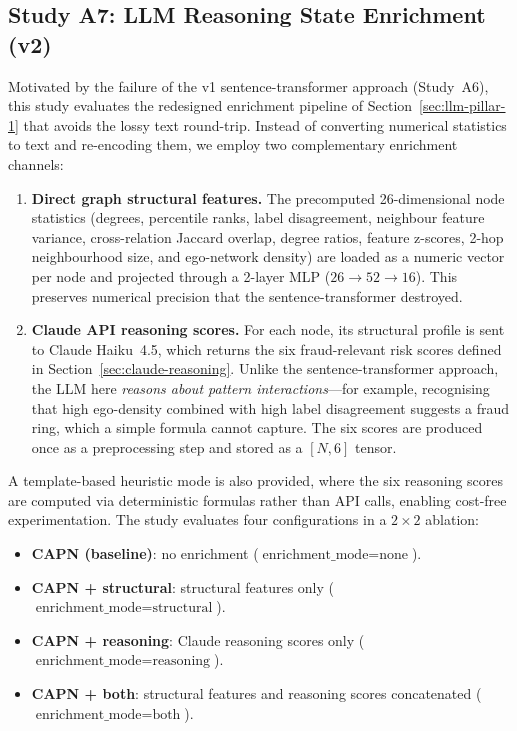 \subsection{Study A7: LLM Reasoning State Enrichment (v2)}
\label{sec:study-a7}
\label{sec:enrichment-v2}

Motivated by the failure of the v1 sentence-transformer approach (Study~A6), this study evaluates the redesigned enrichment pipeline of Section~\ref{sec:llm-pillar-1} that avoids the lossy text round-trip. Instead of converting numerical statistics to text and re-encoding them, we employ two complementary enrichment channels:

\begin{enumerate}
    \item \textbf{Direct graph structural features.} The precomputed 26-dimensional node statistics (degrees, percentile ranks, label disagreement, neighbour feature variance, cross-relation Jaccard overlap, degree ratios, feature z-scores, 2-hop neighbourhood size, and ego-network density) are loaded as a numeric vector per node and projected through a 2-layer MLP ($26 \to 52 \to 16$). This preserves numerical precision that the sentence-transformer destroyed.

    \item \textbf{Claude API reasoning scores.} For each node, its structural profile is sent to Claude Haiku~4.5, which returns the six fraud-relevant risk scores defined in Section~\ref{sec:claude-reasoning}. Unlike the sentence-transformer approach, the LLM here \emph{reasons about pattern interactions}---for example, recognising that high ego-density combined with high label disagreement suggests a fraud ring, which a simple formula cannot capture. The six scores are produced once as a preprocessing step and stored as a $[N, 6]$ tensor.
\end{enumerate}

A template-based heuristic mode is also provided, where the six reasoning scores are computed via deterministic formulas rather than API calls, enabling cost-free experimentation. The study evaluates four configurations in a $2 \times 2$ ablation:
\begin{itemize}
    \item \textbf{CAPN (baseline)}: no enrichment ($\text{enrichment\_mode} = \text{none}$).
    \item \textbf{CAPN + structural}: structural features only ($\text{enrichment\_mode} = \text{structural}$).
    \item \textbf{CAPN + reasoning}: Claude reasoning scores only ($\text{enrichment\_mode} = \text{reasoning}$).
    \item \textbf{CAPN + both}: structural features and reasoning scores concatenated ($\text{enrichment\_mode} = \text{both}$).
\end{itemize}

